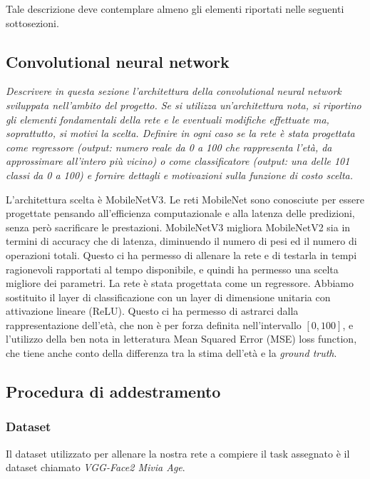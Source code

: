 Tale descrizione deve contemplare almeno gli elementi riportati nelle seguenti
sottosezioni.

\subsection{Convolutional neural network}
\emph{Descrivere in questa sezione l’architettura della convolutional neural network
sviluppata nell’ambito del progetto. Se si utilizza un’architettura nota, si riportino gli elementi fondamentali della rete e le eventuali modifiche effettuate ma, soprattutto, si motivi la scelta.
Definire in ogni caso se la rete è stata progettata come regressore (output:
numero reale da 0 a 100 che rappresenta l’età, da approssimare all’intero più
vicino) o come classificatore (output: una delle 101 classi da 0 a 100) e fornire dettagli e motivazioni sulla funzione di costo scelta.}

L'architettura scelta è MobileNetV3. Le reti MobileNet sono conosciute per essere progettate pensando all'efficienza computazionale e alla latenza delle predizioni, senza però sacrificare le prestazioni. MobileNetV3 migliora MobileNetV2 sia in termini di accuracy che di latenza, diminuendo il numero di pesi ed il numero di operazioni totali. Questo ci ha permesso di allenare la rete e di testarla in tempi ragionevoli rapportati al tempo disponibile, e quindi ha permesso una scelta migliore dei parametri.
La rete è stata progettata come un regressore. Abbiamo sostituito il layer di classificazione con un layer di dimensione unitaria con attivazione lineare (ReLU). Questo ci ha permesso di astrarci dalla rappresentazione dell'età, che non è per forza definita nell'intervallo \([0, 100]\), e l'utilizzo della ben nota in letteratura Mean Squared Error (MSE) loss function, che tiene anche conto della differenza tra la stima dell'età e la \emph{ground truth}.

\subsection{Procedura di addestramento}
\subsubsection{Dataset}
\label{subsubsec:dataset}

Il dataset utilizzato per allenare la nostra rete a compiere il task assegnato è il dataset chiamato \emph{VGG-Face2 Mivia Age}.

